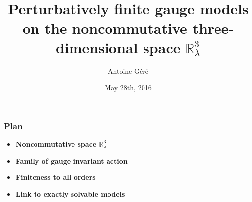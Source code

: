 \documentclass[9pt]{beamer}
\title{Perturbatively finite gauge models on the noncommutative three-dimensional space \texorpdfstring{$\mathbb{R}^3_\lambda$}{R3l}}
\author{Antoine Géré}
\institute{Università degli studi di Genova, Dipartimento di Matematica}
\date{May 28th, 2016}
\begin{document}



\begin{frame}[plain]
\titlepage
\end{frame}


\begin{frame}

\frametitle{Plan}

{\Large{
\begin{itemize}

\item \textbf{Noncommutative space $\mathbb{R}^3_\lambda$} \\[30pt]

\item \textbf{Family of gauge invariant action} \\[30pt]

\item \textbf{Finiteness to all orders} \\[30pt]

\item \textbf{Link to exactly solvable models}

\end{itemize}
}}

\end{frame}

\end{document}
